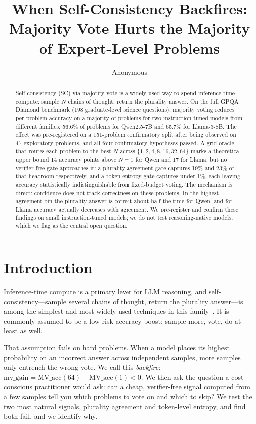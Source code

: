 \documentclass{article}
\title{When Self-Consistency Backfires: Majority Vote Hurts the Majority of Expert-Level Problems}
\author{Anonymous}
\begin{document}
\ifcolmsubmission
\linenumbers
\fi

\maketitle

\begin{abstract}
Self-consistency (SC) via majority vote is a widely used way to spend
inference-time compute: sample $N$ chains of thought, return the plurality
answer. On the full GPQA Diamond benchmark (198 graduate-level science
questions), majority voting reduces per-problem accuracy on a majority of
problems for two instruction-tuned models from different families: 56.6\% of
problems for Qwen2.5-7B and 65.7\% for Llama-3-8B. The effect was
pre-registered on a 151-problem confirmatory split after being observed on
47 exploratory problems, and all four confirmatory hypotheses passed. A grid
oracle that routes each problem to the best $N$ across $\{1,2,4,8,16,32,64\}$
marks a theoretical upper bound 14 accuracy points above $N=1$ for Qwen and
17 for Llama, but no verifier-free gate approaches it: a plurality-agreement
gate captures 19\% and 23\% of that headroom respectively, and a
token-entropy gate captures under 1\%, each leaving accuracy statistically
indistinguishable from fixed-budget voting. The mechanism is direct:
confidence does not track correctness on these problems. In the
highest-agreement bin the plurality answer is correct about half the time for
Qwen, and for Llama accuracy actually decreases with agreement. We
pre-register and confirm these findings on small instruction-tuned models; we
do not test reasoning-native models, which we flag as the central open
question.
\end{abstract}

\section{Introduction}

Inference-time compute is a primary lever for LLM reasoning, and
self-consistency---sample several chains of thought, return the plurality
answer---is among the simplest and most widely used techniques in this
family~\citep{wang2023self}. It is commonly assumed to be a low-risk
accuracy boost: sample more, vote, do at least as well.

That assumption fails on hard problems. When a model places its highest
probability on an incorrect answer across independent samples, more samples
only entrench the wrong vote. We call this \emph{backfire}:
$\text{mv\_gain} = \text{MV\_acc}(64) - \text{MV\_acc}(1) < 0$. We then ask
the question a cost-conscious practitioner would ask: can a cheap,
verifier-free signal computed from a few samples tell you which problems to
vote on and which to skip? We test the two most natural signals, plurality
agreement and token-level entropy, and find both fail, and we identify why.
\end{document}
